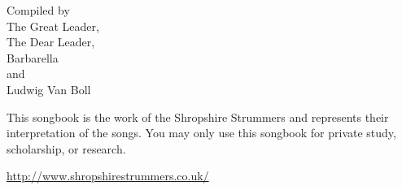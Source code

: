 \documentclass[12pt, a5paper, wordbk]{../SSSongbook}
\begin{document}
\renewcommand\today{November 2017}
  {Compiled by\\
    The Great Leader,\\
    The Dear Leader,\\
    Barbarella\\ and\\ Ludwig Van Boll}

\ifChordBk
  \fancyhead[R,L]{}
  \tableofcontents %
  \vfil
  This songbook is the work of the Shropshire Strummers
  and represents their interpretation of the songs. 
  You may only use this songbook for private study, 
  scholarship, or research.\par
  \begin{center}
    \url{http://www.shropshirestrummers.co.uk/}
  \end{center}
  \pagebreak 
\fi












\end{document}
